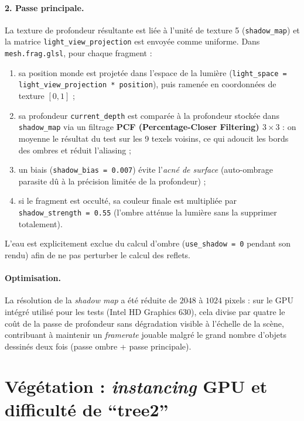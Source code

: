 \documentclass[11pt,a4paper]{article}
\begin{document}
\paragraph{2. Passe principale.} La texture de profondeur résultante est
liée à l'unité de texture 5 (\texttt{shadow\_map}) et la matrice
\texttt{light\_view\_projection} est envoyée comme uniforme. Dans
\texttt{mesh.frag.glsl}, pour chaque fragment :
\begin{enumerate}
    \item sa position monde est projetée dans l'espace de la lumière
    (\texttt{light\_space = light\_view\_projection * position}), puis
    ramenée en coordonnées de texture $[0,1]$ ;
    \item sa profondeur \texttt{current\_depth} est comparée à la
    profondeur stockée dans \texttt{shadow\_map} via un filtrage
    \textbf{PCF (Percentage-Closer Filtering) $3\times 3$} : on moyenne
    le résultat du test sur les 9 texels voisins, ce qui adoucit les
    bords des ombres et réduit l'aliasing ;
    \item un biais (\texttt{shadow\_bias = 0.007}) évite l'\emph{acné de
    surface} (auto-ombrage parasite dû à la précision limitée de la
    profondeur) ;
    \item si le fragment est occulté, sa couleur finale est multipliée
    par \texttt{shadow\_strength = 0.55} (l'ombre atténue la lumière
    sans la supprimer totalement).
\end{enumerate}

L'eau est explicitement exclue du calcul d'ombre
(\texttt{use\_shadow = 0} pendant son rendu) afin de ne pas perturber
le calcul des reflets.

\paragraph{Optimisation.} La résolution de la \emph{shadow map} a été
réduite de $2048$ à $1024$ pixels : sur le GPU intégré utilisé pour les
tests (Intel HD Graphics 630), cela divise par quatre le coût de la
passe de profondeur sans dégradation visible à l'échelle de la scène,
contribuant à maintenir un \emph{framerate} jouable malgré le grand
nombre d'objets dessinés deux fois (passe ombre + passe principale).

\section{Végétation : \emph{instancing} GPU et difficulté de
``tree2''}
\label{sec:vegetation}
\end{document}
